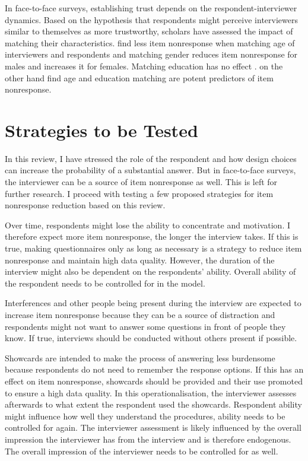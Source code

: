 \documentclass[a4paper,12pt]{article}
\begin{document}
In face-to-face surveys, establishing trust depends on the respondent-interviewer dynamics. Based on the hypothesis that respondents might perceive interviewers similar to themselves as more trustworthy, scholars have assessed the impact of matching their characteristics. \citet{vercruyssenEffectSociodemographicMis2017} find less item nonresponse when matching age
of interviewers and respondents and matching gender reduces item nonresponse for males and increases it for females. Matching education has no effect \citep{vercruyssenEffectSociodemographicMis2017, silberEffectsQuestionRespondent2021}. \citet{tuSocialDistanceRespondent2007} on the other hand find age and education matching are potent predictors of item nonresponse.

\section{Strategies to be Tested}

In this review, I have stressed the role of the respondent and how design choices can increase the probability of a substantial answer. But in face-to-face surveys, the interviewer can be a source of item nonresponse as well. This is left for further research. I proceed with testing a few proposed strategies for item nonresponse reduction based on this review.

Over time, respondents might lose the ability to concentrate and motivation. I therefore expect more item nonresponse, the longer the interview takes. If this is true, making questionnaires only as long as necessary is a strategy to reduce item nonresponse and maintain high data quality. However, the duration of the interview might also be dependent on the respondents' ability. Overall ability of the respondent needs to be controlled for in the model.

Interferences and other people being present during the interview are expected to increase item nonresponse because they can be a source of distraction and respondents might not want to answer some questions in front of people they know. If true, interviews should be conducted without others present if possible.

Showcards are intended to make the process of answering less burdensome because respondents do not need to remember the response options. If this has an effect on item nonresponse, showcards should be provided and their use promoted to ensure a high data quality. In this operationalisation, the interviewer assesses afterwards to what extent the respondent used the showcards. Respondent ability might influence how well they understand the procedures, ability needs to be controlled for again. The interviewer assessment is likely influenced by the overall impression the interviewer has from the interview and is therefore endogenous. The overall impression of the interviewer needs to be controlled for as well.
\end{document}
